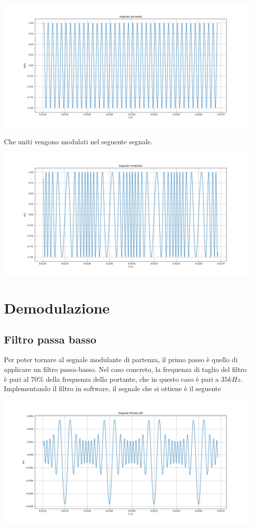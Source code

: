 \documentclass{article}
\begin{document}
\begin{center}
    \includegraphics[width=\textwidth]{portante.png}
\end{center}

\newpage
Che uniti vengono modulati nel seguente segnale.

\begin{center}
    \includegraphics[width=\textwidth]{modulato.png}
\end{center}

\section{Demodulazione}
\subsection{Filtro passa basso}
Per poter tornare al segnale modulante di partenza, il primo passo è quello di applicare un filtro passa-basso.
Nel caso concreto, la frequenza di taglio del filtro è pari al 70\% della frequenza della portante, che in 
questo caso è pari a $35 kHz$.
\\
Implementando il filtro in software, il segnale che si ottiene è il seguente

\begin{center}
    \includegraphics[width=\textwidth]{filtrato.png}
\end{center}
\end{document}
